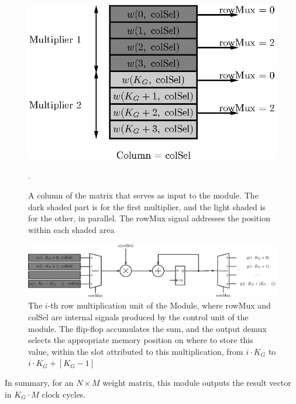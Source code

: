 \begin{figure}
    \centering
    \includegraphics[width=0.9\linewidth]{figures/mem-array-prod.eps}
    \caption[A column of the matrix that serves as input to the module]{A column of the matrix that serves as input to the module. The dark shaded part is for the first multiplier, and the light shaded is for the other, in parallel. The rowMux signal addresses the position within each shaded area}.
    \label{fig:mem-arrayprod}
\end{figure}

\begin{figure}
    \centering
    \includegraphics[width=\linewidth]{figures/array-prod.eps}
    \caption[The $i$-th row multiplication unit of the Module]{The $i$-th row multiplication unit of the Module, where rowMux and colSel are internal signals produced by the control unit of the module. The flip-flop accumulates the sum, and the output demux selects the appropriate memory position on where to store this value, within the slot attributed to this multiplication, from $i\cdot K_G$ to $i\cdot K_G + \left[K_G-1\right]$}
    \label{fig:array-prod}
\end{figure}
In summary, for an $N \times M$ weight matrix, this module outputs the result vector in $K_G \cdot M$ clock cycles.


